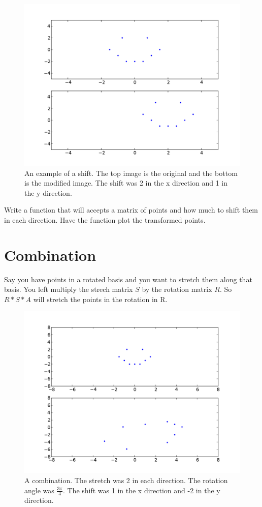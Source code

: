 \begin{figure}[H]
\includegraphics[scale = .5]{shift.pdf}
\caption{
An example of a shift.
The top image is the original and the bottom is the modified image.
The shift was 2 in the x direction and 1 in the y direction.}
\end{figure}

\begin{problem}
Write a function that will accepts a matrix of points and how much to shift them in each direction.
Have the function plot the transformed points.
\end{problem}

\section*{Combination}
Say you have points in a rotated basis and you want to stretch them along that basis.
You left multiply the strech matrix $S$ by the rotation matrix $R$.
So $R*S*A$ will stretch the points in the rotation in R. 

\begin{figure}[H]
\includegraphics[scale = .5]{combo.pdf}
\caption{
A combination.
The stretch was 2 in each direction.
The rotation angle was $\frac{3\pi}{4}$.
The shift was 1 in the x direction and -2 in the y direction.}
\end{figure}


